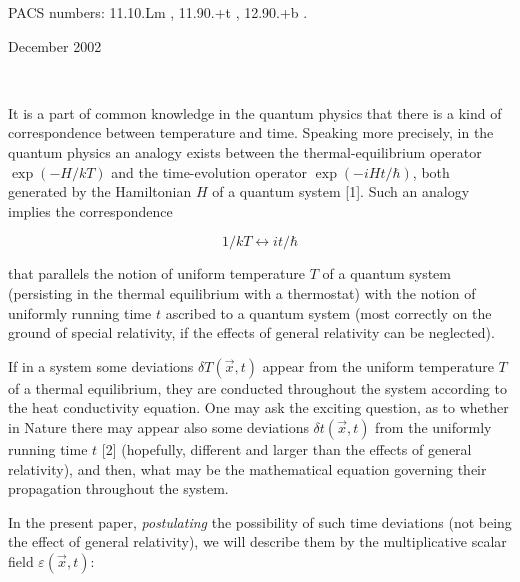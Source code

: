 \documentclass[a4paper,12pt]{article}
\begin{document}
\vspace{0.2cm}

\ni PACS numbers: 11.10.Lm , 11.90.+t , 12.90.+b .

\vspace{0.6cm}

\ni December 2002

\vfill\eject

~~~
\pagestyle {plain}

\setcounter{page}{1}



\vspace{0.2cm}

It is a part of common knowledge in the quantum physics that there is a kind of correspondence between temperature and time. Speaking more precisely, in the quantum physics an analogy exists between the thermal-equilibrium operator $\exp(- H/kT)$ and the time-evolution operator $\exp(- iHt/\hbar)$, both generated by the Hamiltonian $H$ of a quantum system [1]. Such an analogy implies the correspondence

\vspace{-0.2cm}

\begin{equation}
1/kT \leftrightarrow it/\hbar
\end{equation}

\ni that parallels the notion of uniform temperature $T$ of a quantum system (persisting in the thermal equilibrium with a thermostat) with the notion of uniformly running time $t$ ascribed to a quantum system (most correctly on the ground of special relativity, if the effects of general relativity can be neglected).

If in a system some deviations $\delta T(\vec{x},t)$ appear from the uniform temperature $T$ of a thermal equilibrium, they are conducted throughout the system according to the heat conductivity equation. One may ask the exciting question, as to whether in Nature there may appear also some deviations $\delta t(\vec{x},t)$ from the uniformly running time $t$ [2] (hopefully, different and larger than the effects of general relativity), and then, what may be the mathematical equation governing their propagation throughout the system.

In the present paper, {\it postulating} the possibility of such time deviations (not being the effect of general relativity), we will describe them by the multiplicative scalar field $\varepsilon(\vec{x},t)$:
\end{document}
